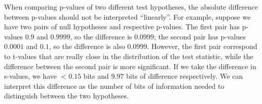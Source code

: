 When comparing p-values of two different test hypotheses, the absolute difference between p-values should not be interpreted ``linearly''. For example, suppose we have two pairs of null hypotheses and respective p-values. The first pair has p-values $0.9$ and $0.9999$, so the difference is $0.0999$; the second pair has p-values $0.0001$ and $0.1$, so the difference is also $0.0999$. However, the first pair correspond to t-values that are really close in the distribution of the test statistic, while the difference between the second pair is more significant. If we take the difference in s-values, we have $< 0.15$ bits and $9.97$ bits of difference respectively. We can interpret this difference as the number of bits of information needed to distinguish between the two hypotheses.
